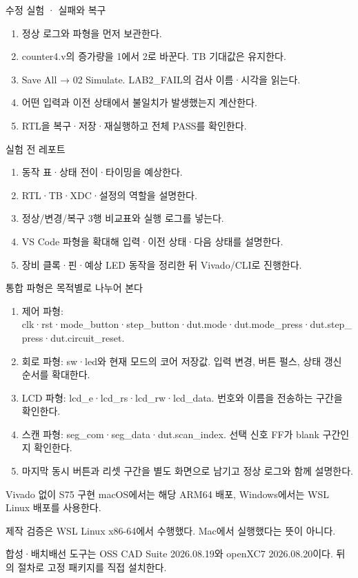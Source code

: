 \begin{frame}{수정 실험 · 실패와 복구}
\small
\begin{enumerate}
\item 정상 로그와 파형을 먼저 보관한다.
\item counter4.v의 증가량을 1에서 2로 바꾼다. TB 기대값은 유지한다.
\item Save All → 02 Simulate. LAB2\_FAIL의 검사 이름·시각을 읽는다.
\item 어떤 입력과 이전 상태에서 불일치가 발생했는지 계산한다.
\item RTL을 복구·저장·재실행하고 전체 PASS를 확인한다.
\end{enumerate}
\end{frame}

\begin{frame}[label=reports]{실험 전 레포트}
\small
\begin{enumerate}
\item 동작 표·상태 전이·타이밍을 예상한다.
\item RTL·TB·XDC·설정의 역할을 설명한다.
\item 정상/변경/복구 3행 비교표와 실행 로그를 넣는다.
\item VS Code 파형을 확대해 입력·이전 상태·다음 상태를 설명한다.
\item 장비 클록·핀·예상 LED 동작을 정리한 뒤 Vivado/CLI로 진행한다.
\end{enumerate}
\end{frame}

\begin{frame}{통합 파형은 목적별로 나누어 본다}
\small
\begin{enumerate}
\item 제어 파형: clk·rst·mode\_button·step\_button·dut.mode·dut.mode\_press·dut.step\_press·dut.circuit\_reset.
\item 회로 파형: sw·led와 현재 모드의 코어 저장값. 입력 변경, 버튼 펄스, 상태 갱신 순서를 확대한다.
\item LCD 파형: lcd\_e·lcd\_rs·lcd\_rw·lcd\_data. 번호와 이름을 전송하는 구간을 확인한다.
\item 스캔 파형: seg\_com·seg\_data·dut.scan\_index. 선택 신호 FF가 blank 구간인지 확인한다.
\item 마지막 동시 버튼과 리셋 구간을 별도 화면으로 남기고 정상 로그와 함께 설명한다.
\end{enumerate}
\end{frame}

\begin{frame}[label=implementation]{Vivado 없이 S75 구현}
\small
macOS에서는 해당 ARM64 배포, Windows에서는 WSL Linux 배포를 사용한다.\par\vspace{0.26cm}제작 검증은 WSL Linux x86-64에서 수행했다. Mac에서 실행했다는 뜻이 아니다.\par\vspace{0.26cm}합성·배치배선 도구는 OSS CAD Suite 2026.08.19와 openXC7 2026.08.20이다. 뒤의 절차로 고정 패키지를 직접 설치한다.\par
\end{frame}

